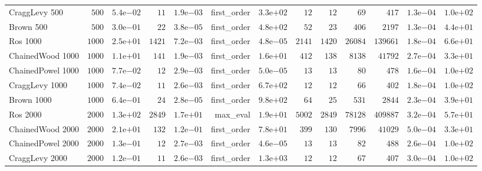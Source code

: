 \begin{longtable}[c]{lrrrrrrrrrrrr}
CraggLevy 500 & \(  500\) & \( 5.4\)e\(-02\) & \(   11\) & \( 1.9\)e\(-03\) & first\_order & \( 3.3\)e\(+02\) & \(   12\) & \(   12\) & \(   69\) & \(  417\) & \( 1.3\)e\(-04\) & \( 1.0\)e\(+02\) \\
Brown 500 & \(  500\) & \( 3.0\)e\(-01\) & \(   22\) & \( 3.8\)e\(-05\) & first\_order & \( 4.8\)e\(+02\) & \(   52\) & \(   23\) & \(  406\) & \( 2197\) & \( 1.3\)e\(-04\) & \( 4.4\)e\(+01\) \\
Ros 1000 & \( 1000\) & \( 2.5\)e\(+01\) & \( 1421\) & \( 7.2\)e\(-03\) & first\_order & \( 4.8\)e\(-05\) & \( 2141\) & \( 1420\) & \(26084\) & \(139661\) & \( 1.8\)e\(-04\) & \( 6.6\)e\(+01\) \\
ChainedWood 1000 & \( 1000\) & \( 1.1\)e\(+01\) & \(  141\) & \( 1.9\)e\(-03\) & first\_order & \( 1.6\)e\(+01\) & \(  412\) & \(  138\) & \( 8138\) & \(41792\) & \( 2.7\)e\(-04\) & \( 3.3\)e\(+01\) \\
ChainedPowel 1000 & \( 1000\) & \( 7.7\)e\(-02\) & \(   12\) & \( 2.9\)e\(-03\) & first\_order & \( 5.0\)e\(-05\) & \(   13\) & \(   13\) & \(   80\) & \(  478\) & \( 1.6\)e\(-04\) & \( 1.0\)e\(+02\) \\
CraggLevy 1000 & \( 1000\) & \( 7.4\)e\(-02\) & \(   11\) & \( 2.6\)e\(-03\) & first\_order & \( 6.7\)e\(+02\) & \(   12\) & \(   12\) & \(   66\) & \(  402\) & \( 1.8\)e\(-04\) & \( 1.0\)e\(+02\) \\
Brown 1000 & \( 1000\) & \( 6.4\)e\(-01\) & \(   24\) & \( 2.8\)e\(-05\) & first\_order & \( 9.8\)e\(+02\) & \(   64\) & \(   25\) & \(  531\) & \( 2844\) & \( 2.3\)e\(-04\) & \( 3.9\)e\(+01\) \\
Ros 2000 & \( 2000\) & \( 1.3\)e\(+02\) & \( 2849\) & \( 1.7\)e\(+01\) & max\_eval & \( 1.9\)e\(+01\) & \( 5002\) & \( 2849\) & \(78128\) & \(409887\) & \( 3.2\)e\(-04\) & \( 5.7\)e\(+01\) \\
ChainedWood 2000 & \( 2000\) & \( 2.1\)e\(+01\) & \(  132\) & \( 1.2\)e\(-01\) & first\_order & \( 7.8\)e\(+01\) & \(  399\) & \(  130\) & \( 7996\) & \(41029\) & \( 5.0\)e\(-04\) & \( 3.3\)e\(+01\) \\
ChainedPowel 2000 & \( 2000\) & \( 1.3\)e\(-01\) & \(   12\) & \( 2.7\)e\(-03\) & first\_order & \( 4.6\)e\(-05\) & \(   13\) & \(   13\) & \(   82\) & \(  488\) & \( 2.6\)e\(-04\) & \( 1.0\)e\(+02\) \\
CraggLevy 2000 & \( 2000\) & \( 1.2\)e\(-01\) & \(   11\) & \( 2.6\)e\(-03\) & first\_order & \( 1.3\)e\(+03\) & \(   12\) & \(   12\) & \(   67\) & \(  407\) & \( 3.0\)e\(-04\) & \( 1.0\)e\(+02\) \\

\end{longtable}
